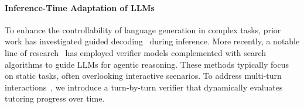\paragraph{Inference-Time Adaptation of LLMs}
To enhance the controllability of language generation in complex tasks, prior work has investigated guided decoding~\citep{dathathri2020plug,chaffin-etal-2022-ppl} during inference. 
More recently, a notable line of research~\citep{lightman2023let,li-etal-2023-making,wang2024math,pan2024training} has employed verifier models complemented with search algorithms to guide LLMs for agentic reasoning. 
These methods typically focus on static tasks, often overlooking interactive scenarios.
To address multi-turn interactions~\citep{wang2024mint}, we introduce a turn-by-turn verifier that dynamically evaluates tutoring progress over time.